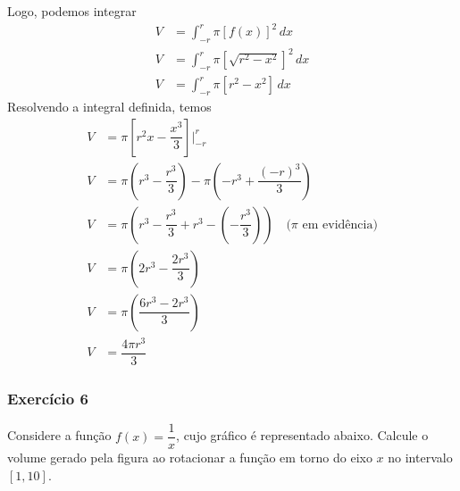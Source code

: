 \documentclass[12pt,openright,twoside,a4paper]{article}
\theoremstyle{definition}
\begin{document}
		Logo, podemos integrar
		\begin{align*}
			V &= \int_{-r}^{r} \pi [f(x)]^2 \, dx\\
			V &= \int_{-r}^{r} \pi \left[\sqrt{r^2 - x^2}\right]^2 \, dx\\
			V &= \int_{-r}^{r} \pi [r^2 - x^2] \, dx
		\end{align*}
		Resolvendo a integral definida, temos
		\begin{align*}
			V &= \pi \left[ r^2x - \dfrac{x^3}{3} \right]\bigg|_{-r}^{r} \\
			V &= \pi \left( r^3 - \dfrac{r^3}{3} \right) - \pi \left( -r^3 + \dfrac{(-r)^3}{3} \right) \\
			V &= \pi \left( r^3 - \dfrac{r^3}{3} + r^3 - \left( -\dfrac{r^3}{3} \right) \right) \quad \text{($\pi$ em evidência)}\\
			V &= \pi \left( 2r^3 - \dfrac{2r^3}{3} \right) \\
			V &= \pi \left( \dfrac{6r^3 - 2r^3}{3} \right) \\
			V &= \dfrac{4\pi r^3}{3}
		\end{align*}
		
	
	\subsubsection{Exercício 6}
	Considere a função $f(x) = \dfrac{1}{x}$, cujo gráfico é representado abaixo. Calcule o volume gerado pela figura ao rotacionar a função em torno do eixo $x$ no intervalo $[1,10]$.
		
\end{document}
